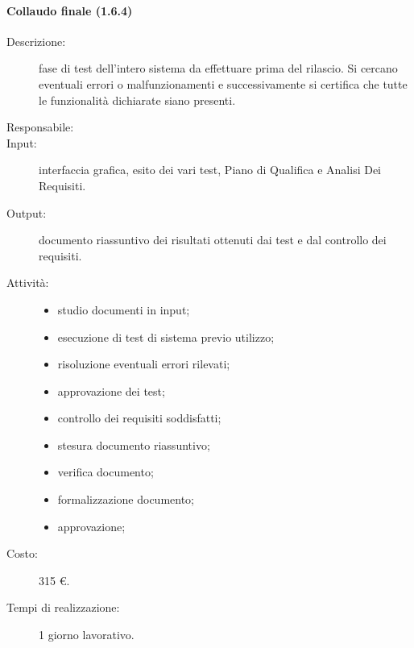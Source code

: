 \paragraph{Collaudo finale (1.6.4)}
\begin{description}
\item[Descrizione:] fase di test dell'intero sistema da effettuare prima del rilascio. Si cercano eventuali errori o malfunzionamenti e successivamente si certifica che tutte le funzionalit\`{a} dichiarate siano presenti.
\item[Responsabile:] 
\item[Input:] interfaccia grafica, esito dei vari test, Piano di Qualifica e Analisi Dei Requisiti.
\item[Output:] documento riassuntivo dei risultati ottenuti dai test e dal controllo dei requisiti.
\item[Attivit\`{a}:] 
\begin{center}
\begin{itemize}
\item studio documenti in input;
\item esecuzione di test di sistema previo utilizzo;
\item risoluzione eventuali errori rilevati;
\item approvazione dei test;
\item controllo dei requisiti soddisfatti;
\item stesura documento riassuntivo;
\item verifica documento;
\item formalizzazione documento;
\item approvazione;
\end{itemize}
\end{center}
\item[Costo:] 315 \euro{}.
\item[Tempi di realizzazione:] 1 giorno lavorativo.
\end{description}

